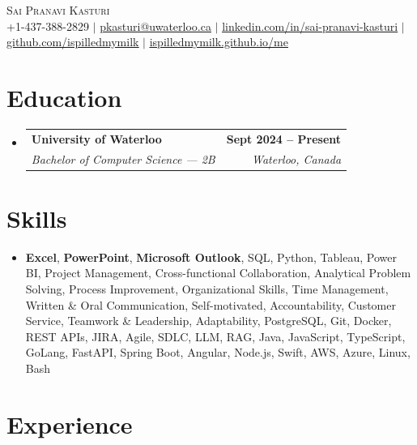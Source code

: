 \documentclass[letterpaper,10pt]{article}
\makeatletter
\newcommand{\resumeSubheading}[4]{
  \vspace{-1pt}\item
    \begin{tabular*}{1.0\textwidth}[t]{l@{\extracolsep{\fill}}r}
      \textbf{#1} & \textbf{\small #2} \\
      \textit{\small#3} & \textit{\small #4} \\[-2pt]
    \end{tabular*}\vspace{-7pt}
}
\newcommand{\resumeSubHeadingListStart}{\begin{itemize}[leftmargin=0.0in, label={}]}
\newcommand{\resumeSubHeadingListEnd}{\end{itemize}}
\makeatother
\begin{document}

\vspace{-28pt}
\begin{center}
    {\Huge \scshape Sai Pranavi Kasturi} \\
    \small +1-437-388-2829 $|$ \underline{pkasturi@uwaterloo.ca} $|$
    \href{https://linkedin.com/in/sai-pranavi-kasturi-704807298}{\underline{linkedin.com/in/sai-pranavi-kasturi}} $|$
    \href{https://github.com/ispilledmymilk}{\underline{github.com/ispilledmymilk}} $|$
    \href{https://ispilledmymilk.github.io/me/}{\underline{ispilledmymilk.github.io/me}}
    \vspace{-10pt}
\end{center}

\vspace{-10pt}
\section{Education}
  \resumeSubHeadingListStart
    \resumeSubheading
      {University of Waterloo}{Sept 2024 -- Present}
      {Bachelor of Computer Science --- 2B}{Waterloo, Canada}
  \resumeSubHeadingListEnd
\vspace{-8pt}

\section{Skills}
\begin{itemize}[leftmargin=0.05in, label={}]
  \small\item{
    \textbf{Excel}, \textbf{PowerPoint}, \textbf{Microsoft Outlook}, SQL, Python, Tableau, Power BI, Project Management, Cross-functional Collaboration, Analytical Problem Solving, Process Improvement, Organizational Skills, Time Management, Written \& Oral Communication, Self-motivated, Accountability, Customer Service, Teamwork \& Leadership, Adaptability, PostgreSQL, Git, Docker, REST APIs, JIRA, Agile, SDLC, LLM, RAG, Java, JavaScript, TypeScript, GoLang, FastAPI, Spring Boot, Angular, Node.js, Swift, AWS, Azure, Linux, Bash
  }
\end{itemize}
\vspace{-18pt}

\vspace{1.20pt}
\section{Experience}
\end{document}
